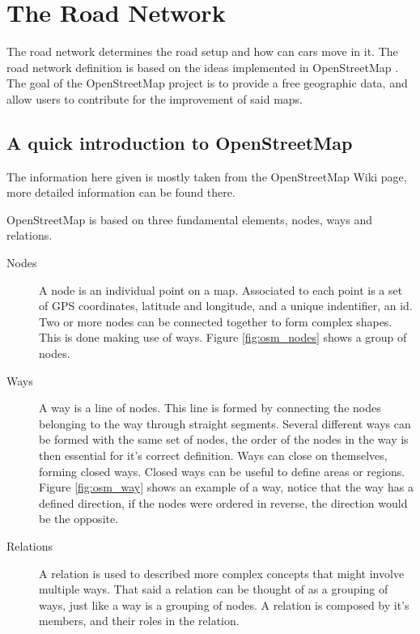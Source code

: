 \section{The Road Network}
\label{sec:theroadnetwork}

The road network determines the road setup and how can cars move in it. The road network definition is based on the ideas implemented in OpenStreetMap \cite{OSM}. The goal of the OpenStreetMap project is to provide a free geographic data, and allow users to contribute for the improvement of said maps.

\subsection{A quick introduction to OpenStreetMap}

The information here given is mostly taken from the OpenStreetMap Wiki page, more detailed information can be found there.

OpenStreetMap is based on three fundamental elements, nodes, ways and relations.

\begin{description}
  \item[Nodes] A node is an individual point on a map. Associated to each point is a set of GPS coordinates, latitude and longitude, and a unique indentifier, an id. Two or more nodes can be connected together to form complex shapes. This is done making use of ways. Figure \ref{fig:osm_nodes} shows a group of nodes.
  \item[Ways] A way is a line of nodes. This line is formed by connecting the nodes belonging to the way through straight segments. Several different ways can be formed with the same set of nodes, the order of the nodes in the way is then essential for it's correct definition. Ways can close on themselves, forming closed ways. Closed ways can be useful to define areas or regions. Figure \ref{fig:osm_way} shows an example of a way, notice that the way has a defined direction, if the nodes were ordered in reverse, the direction would be the opposite.
  \item[Relations]A relation is used to described more complex concepts that might involve multiple ways. That said a relation can be thought of as a grouping of ways, just like a way is a grouping of nodes. A relation is composed by it's members, and their roles in the relation.
\end{description}


